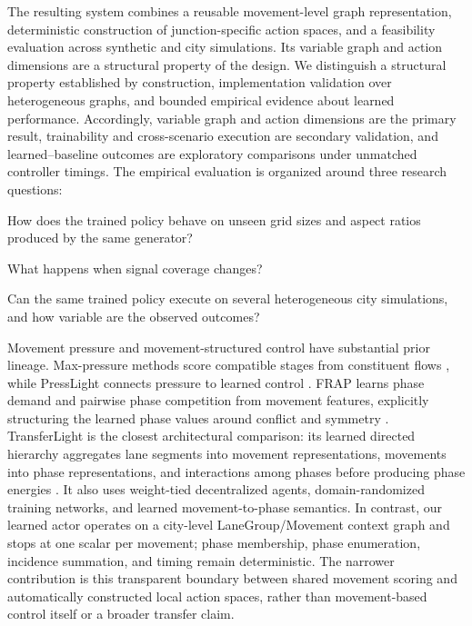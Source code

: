\documentclass[10pt,a4paper]{article}
\begin{document}
The resulting system combines a reusable movement-level graph representation, deterministic construction of junction-specific action spaces, and a feasibility evaluation across synthetic and city simulations.
Its variable graph and action dimensions are a structural property of the design.
We distinguish a structural property established by construction, implementation validation over heterogeneous graphs, and bounded empirical evidence about learned performance.
Accordingly, variable graph and action dimensions are the primary result, trainability and cross-scenario execution are secondary validation, and learned--baseline outcomes are exploratory comparisons under unmatched controller timings.
The empirical evaluation is organized around three research questions:
\begin{description}[leftmargin=4.2em,style=nextline]
  \item[RQ1 --- Transfer within the synthetic generator family.] How does the trained policy behave on unseen grid sizes and aspect ratios produced by the same generator?
  \item[RQ2 --- Distribution shift.] What happens when signal coverage changes?
  \item[RQ3 --- City feasibility.] Can the same trained policy execute on several heterogeneous city simulations, and how variable are the observed outcomes?
\end{description}

Movement pressure and movement-structured control have substantial prior lineage.
Max-pressure methods score compatible stages from constituent flows \cite{varaiya2013maxpressure}, while PressLight connects pressure to learned control \cite{wei2019presslight}.
FRAP learns phase demand and pairwise phase competition from movement features, explicitly structuring the learned phase values around conflict and symmetry \cite{zheng2019frap}.
TransferLight is the closest architectural comparison: its learned directed hierarchy aggregates lane segments into movement representations, movements into phase representations, and interactions among phases before producing phase energies \cite{schmidt2024transferlight}.
It also uses weight-tied decentralized agents, domain-randomized training networks, and learned movement-to-phase semantics.
In contrast, our learned actor operates on a city-level LaneGroup/Movement context graph and stops at one scalar per movement; phase membership, phase enumeration, incidence summation, and timing remain deterministic.
The narrower contribution is this transparent boundary between shared movement scoring and automatically constructed local action spaces, rather than movement-based control itself or a broader transfer claim.
\end{document}
